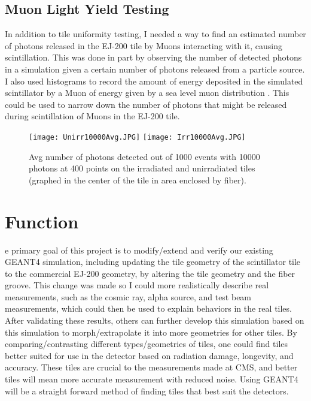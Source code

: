 \documentclass[11pt,twoside,a4paper,dn,final]{cms-tdr}
\begin{document}
\subsection{Muon Light Yield Testing}
	In addition to tile uniformity testing, I needed a way to find an estimated number of photons released in the EJ-200 tile by Muons interacting with it, causing scintillation. This was done in part by observing the number of detected photons in a simulation given a certain number of photons released from a particle source. I also used histograms to record the amount of energy deposited in the simulated scintillator by a Muon of energy given by a sea level muon distribution \cite{hlw07}. This could be used to narrow down the number of photons that might be released during scintillation of Muons in the EJ-200 tile.

\begin{figure}[h!]
  \begin{center}
    \texttt{[image: Unirr10000Avg.JPG]}
    \texttt{[image: Irr10000Avg.JPG]}
    \caption{Avg number of photons detected out of 1000 events with 10000 photons at 400 points on the irradiated and unirradiated tiles (graphed in the center of the tile in area enclosed by fiber).}
    \label{fig:4}
  \end{center}
\end{figure}

\section{Function}
e primary goal of this project is to modify/extend and verify our existing GEANT4 simulation, including updating the tile geometry of the scintillator tile to the commercial EJ-200 geometry, by altering the tile geometry and the fiber groove. This change was made so I could more realistically describe real measurements, such as the cosmic ray, alpha source, and test beam measurements, which could then be used to explain behaviors in the real tiles. After validating these results, others can further develop this simulation based on this simulation to morph/extrapolate it into more geometries for other tiles. By comparing/contrasting different types/geometries of tiles, one could find tiles better suited for use in the detector based on radiation damage, longevity, and accuracy. These tiles are crucial to the measurements made at CMS, and better tiles will mean more accurate measurement with reduced noise. Using GEANT4 will be a straight forward method of finding tiles that best suit the detectors. 
\end{document}
